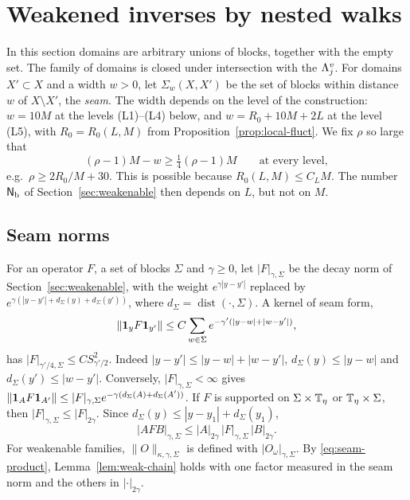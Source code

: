 \section{Weakened inverses by nested walks}\label{sec:nested-walks}

In this section domains are arbitrary unions of blocks, together with the empty set. The family of domains is closed under intersection with the $\Lambda^v_j$. For domains $X'\subset X$ and a width $w>0$, let $\Sigma_w(X,X')$ be the set of blocks within distance $w$ of $X\setminus X'$, the \emph{seam}. The width depends on the level of the construction: $w=10M$ at the levels (L1)--(L4) below, and $w=R_0+10M+2L$ at the level (L5), with $R_0=R_0(L,M)$ from Proposition~\ref{prop:local-fluct}. We fix $\rho$ so large that
\begin{equation}\label{eq:rho-choice}
(\rho-1)M-w\ge\tfrac14(\rho-1)M\qquad\text{at every level},
\end{equation}
e.g.\ $\rho\ge2R_0/M+30$. This is possible because $R_0(L,M)\le C_LM$. The number $\mathsf N_{\rm b}$ of Section~\ref{sec:weakenable} then depends on $L$, but not on $M$.

\subsection{Seam norms}\label{ss:41.1}

For an operator $F$, a set of blocks $\Sigma$ and $\gamma\ge0$, let $|F|_{\gamma,\Sigma}$ be the decay norm of Section~\ref{sec:weakenable}, with the weight $e^{\gamma|y-y'|}$ replaced by $e^{\gamma(|y-y'|+d_\Sigma(y)+d_\Sigma(y'))}$, where $d_\Sigma=\operatorname{dist}(\cdot,\Sigma)$. A kernel of seam form,
\[
\|\mathbf 1_yF\mathbf 1_{y'}\|\le C\sum_{w\in\Sigma}e^{-\gamma'(|y-w|+|w-y'|)},
\]
has $|F|_{\gamma'/4,\Sigma}\le CS_{\gamma'/2}^2$. Indeed $|y-y'|\le|y-w|+|w-y'|$, $d_\Sigma(y)\le|y-w|$ and $d_\Sigma(y')\le|w-y'|$. Conversely, $|F|_{\gamma,\Sigma}<\infty$ gives $\|\mathbf 1_AF\mathbf 1_{A'}\|\le|F|_{\gamma,\Sigma}e^{-\gamma(d_\Sigma(A)+d_\Sigma(A'))}$. If $F$ is supported on $\Sigma\times\mathbb T_\eta$ or $\mathbb T_\eta\times\Sigma$, then $|F|_{\gamma,\Sigma}\le|F|_{2\gamma}$. Since $d_\Sigma(y)\le|y-y_1|+d_\Sigma(y_1)$,
\begin{equation}\label{eq:seam-product}
|AFB|_{\gamma,\Sigma}\le|A|_{2\gamma}\,|F|_{\gamma,\Sigma}\,|B|_{2\gamma}.
\end{equation}
For weakenable families, $\|O\|_{\kappa,\gamma,\Sigma}$ is defined with $|O_\omega|_{\gamma,\Sigma}$. By \eqref{eq:seam-product}, Lemma~\ref{lem:weak-chain} holds with one factor measured in the seam norm and the others in $|\cdot|_{2\gamma}$.

